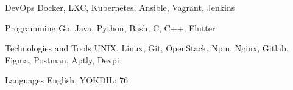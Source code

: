 

\begin{cvskills}

  \cvskill
    {DevOps} %
    {Docker, LXC, Kubernetes, Ansible, Vagrant, Jenkins} %

  \cvskill
    {Programming} %
    {Go, Java, Python, Bash, C, C++, Flutter} %

  \cvskill
    {Technologies and Tools} %
    {UNIX, Linux, Git, OpenStack, Npm, Nginx, Gitlab, Figma, Postman, Aptly, Devpi} %

  \cvskill
    {Languages} %
    {English, YOKDIL: 76} %

\end{cvskills}
